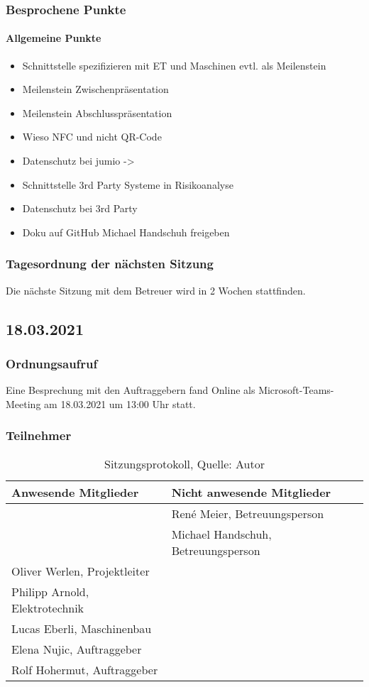 \subsubsection{Besprochene Punkte}
\paragraph{Allgemeine Punkte}
\begin{itemize}
	\item Schnittstelle spezifizieren mit ET und Maschinen evtl. als Meilenstein
	\item Meilenstein Zwischenpräsentation
	\item Meilenstein Abschlusspräsentation
	\item Wieso NFC und nicht QR-Code
	\item Datenschutz bei jumio -> 
	\item Schnittstelle 3rd Party Systeme in Risikoanalyse
	\item Datenschutz bei 3rd Party
	\item Doku auf GitHub Michael Handschuh freigeben
\end{itemize}
\subsubsection{Tagesordnung der nächsten Sitzung}
Die nächste Sitzung mit dem Betreuer wird in 2 Wochen stattfinden. 
\subsection{18.03.2021}
\subsubsection{Ordnungsaufruf}
Eine Besprechung mit den Auftraggebern fand Online als Microsoft-Teams-Meeting am 18.03.2021 um 13:00 Uhr statt.
\subsubsection{Teilnehmer}
\begin{table}[H]
	\setlength\extrarowheight{2pt} %
	\begin{tabularx}{\textwidth}{|X|X|}
		\hline
		\textbf{Anwesende Mitglieder} &  \textbf{Nicht anwesende Mitglieder} \\
		\hline
		& René Meier, Betreuungsperson  \\
		& Michael Handschuh, Betreuungsperson   \\
		Oliver Werlen, Projektleiter &  \\
		Philipp Arnold, Elektrotechnik & \\
		Lucas Eberli, Maschinenbau & \\
		Elena Nujic, Auftraggeber & \\
		Rolf Hohermut, Auftraggeber & \\
		\hline
	\end{tabularx}
	\caption{ \label{tbl: Teilnehmerliste vom 18.03.2021}Sitzungsprotokoll, Quelle: Autor}
\end{table}
